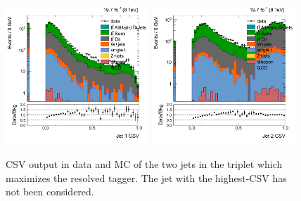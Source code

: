 \begin{figure}[htbp]
	\centering
	\includegraphics[width=0.48\textwidth]{figures/semilep_1tightmuo_resolved_3ormorejets_2ormorejetWPm_pfmetmore100_pfmtmore40_trigrequestonMC_17102015/res_hJet1csv.png}
	\includegraphics[width=0.48\textwidth]{figures/semilep_1tightmuo_resolved_3ormorejets_2ormorejetWPm_pfmetmore100_pfmtmore40_trigrequestonMC_17102015/res_hJet2csv.png}
	\caption{CSV output in data and MC of the two jets in the triplet which maximizes the resolved tagger. The jet with the highest-CSV has not been considered.}
	\label{fig:jet12csv}
\end{figure}

